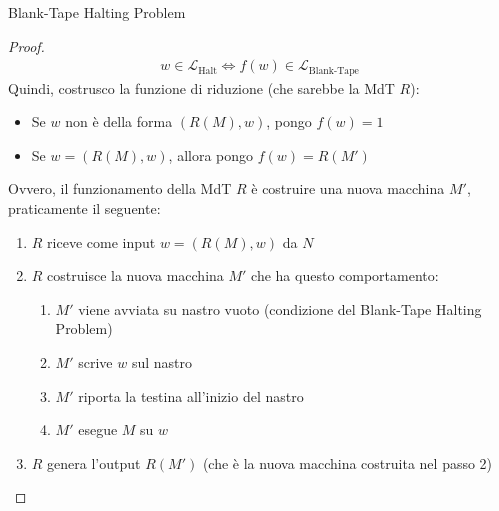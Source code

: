 \documentclass{article}  %
\theoremstyle{definition}
\begin{document}
\begin{theorem}{Blank-Tape Halting Problem}
\begin{proof}
    \begin{align*}
      w \in \mathcal{L}_{\text{Halt}} \iff f(w) \in \mathcal{L}_{\text{Blank-Tape}}
    \end{align*}
    Quindi, costrusco la funzione di riduzione (che sarebbe la MdT $R$):
    \begin{itemize}
      \item Se $w$ non è della forma $(R(M),w)$, pongo $f(w)=1$
      \item Se $w=(R(M),w)$, allora pongo $f(w)=R(M')$
    \end{itemize}
    Ovvero, il funzionamento della MdT $R$ è costruire una nuova macchina $M'$, praticamente il seguente:
    \begin{enumerate}
      \item $R$ riceve come input $w=(R(M),w)$ da $N$
      \item $R$ costruisce la nuova macchina $M'$ che ha questo comportamento:
      \begin{enumerate}
        \item $M'$ viene avviata su nastro vuoto (condizione del Blank-Tape Halting Problem)
        \item $M'$ scrive $w$ sul nastro
        \item $M'$ riporta la testina all'inizio del nastro
        \item $M'$ esegue $M$ su $w$
      \end{enumerate}
      \item $R$ genera l'output $R(M')$ (che è la nuova macchina costruita nel passo 2)















\end{enumerate}
\end{proof}
\end{theorem}
\end{document}
